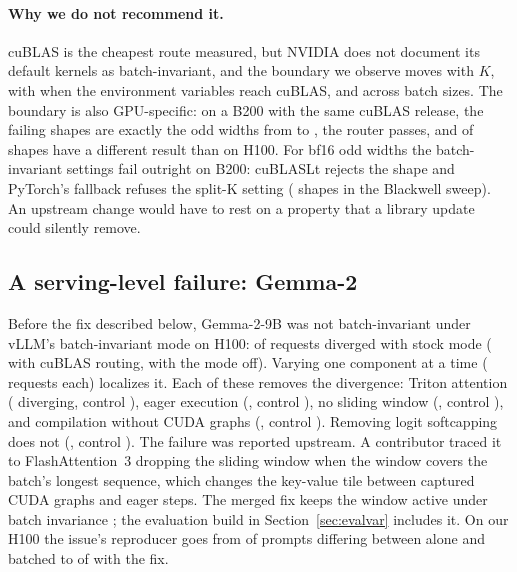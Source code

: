 \begin{table}[htbp]\centering\small
\resizebox{\linewidth}{!}{}
\caption{Requests whose 8 runs were not all identical, with Linear layers on cuBLAS under batch-invariant mode (plain cuBLAS) and with batch-invariant mode off (control). Markers count processes that loaded the routing change.}\label{tab:det}
\end{table}

\begin{table}[htbp]\centering\small
\resizebox{\linewidth}{!}{}
\caption{Decode throughput loss at batch 32 against batch-invariant mode off. Median of three jobs.}\label{tab:cost}
\end{table}

\paragraph{Why we do not recommend it.} cuBLAS is the cheapest route measured, but NVIDIA does not document its default kernels as batch-invariant, and the boundary we observe moves with $K$, with when the environment variables reach cuBLAS, and across batch sizes. The boundary is also GPU-specific: on a B200 with the same cuBLAS release, the failing shapes are exactly the odd widths from \BtwoFailMin{} to \BtwoFailMax{}, the router passes, and \BtwoDiffer{} of \BtwoShapes{} shapes have a different result than on H100. For bf16 odd widths the batch-invariant settings fail outright on B200: cuBLASLt rejects the shape and PyTorch's fallback refuses the split-K setting (\OneEErrA{} shapes in the Blackwell sweep). An upstream change would have to rest on a property that a library update could silently remove.



\subsection{A serving-level failure: Gemma-2}\label{sec:gemma}
Before the fix described below, Gemma-2-9B was not batch-invariant under vLLM's batch-invariant mode on H100: \GemmaOnDiv{} of \GemmaReq{} requests diverged with stock mode (\GemmaPlainDiv{} with cuBLAS routing, \GemmaOffDiv{} with the mode off). Varying one component at a time (\DiagReq{} requests each) localizes it. Each of these removes the divergence: Triton attention (\DiagTritonOn{} diverging, control \DiagTritonOff{}), eager execution (\DiagEagerOn{}, control \DiagEagerOff{}), no sliding window (\DiagNoswOn{}, control \DiagNoswOff{}), and compilation without CUDA graphs (\DiagNocgOn{}, control \DiagNocgOff{}). Removing logit softcapping does not (\DiagNoscOn{}, control \DiagNoscOff{}). The failure was reported upstream. A contributor traced it to FlashAttention~3 dropping the sliding window when the window covers the batch's longest sequence, which changes the key-value tile between captured CUDA graphs and eager steps. The merged fix keeps the window active under batch invariance \citep{vllm65627}; the evaluation build in Section~\ref{sec:evalvar} includes it. On our H100 the issue's reproducer goes from \FafixBase{} of \FafixN{} prompts differing between alone and batched to \FafixFix{} of \FafixN{} with the fix.
